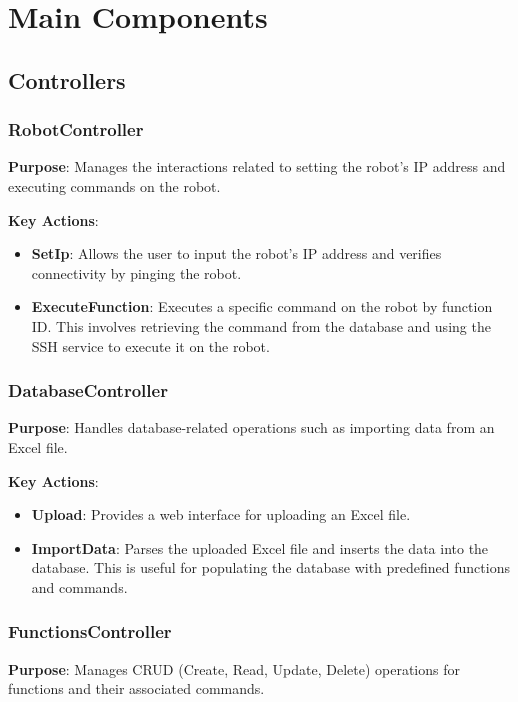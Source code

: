 \section{Main Components}

\subsection{Controllers}

\subsubsection{RobotController}
\textbf{Purpose}: Manages the interactions related to setting the robot's IP address and executing commands on the robot.

\textbf{Key Actions}:
\begin{itemize}
	\item \textbf{SetIp}: Allows the user to input the robot's IP address and verifies connectivity by pinging the robot.
	\item \textbf{ExecuteFunction}: Executes a specific command on the robot by function ID. This involves retrieving the command from the database and using the SSH service to execute it on the robot.
\end{itemize}

\subsubsection{DatabaseController}
\textbf{Purpose}: Handles database-related operations such as importing data from an Excel file.

\textbf{Key Actions}:
\begin{itemize}
	\item \textbf{Upload}: Provides a web interface for uploading an Excel file.
	\item \textbf{ImportData}: Parses the uploaded Excel file and inserts the data into the database. This is useful for populating the database with predefined functions and commands.
\end{itemize}

\subsubsection{FunctionsController}
\textbf{Purpose}: Manages CRUD (Create, Read, Update, Delete) operations for functions and their associated commands.


